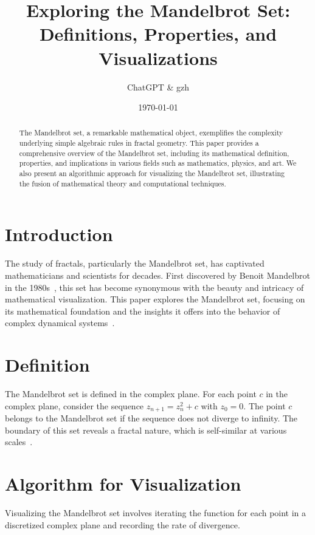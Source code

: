 \documentclass[12pt]{article}
\title{Exploring the Mandelbrot Set: Definitions, Properties, and Visualizations}
\author{ChatGPT \& gzh}
\date{\today}
\begin{document}
\maketitle

\begin{abstract}
    The Mandelbrot set, a remarkable mathematical object, exemplifies the complexity underlying simple algebraic rules in fractal geometry. This paper provides a comprehensive overview of the Mandelbrot set, including its mathematical definition, properties, and implications in various fields such as mathematics, physics, and art. We also present an algorithmic approach for visualizing the Mandelbrot set, illustrating the fusion of mathematical theory and computational techniques.
\end{abstract}

\section{Introduction}
The study of fractals, particularly the Mandelbrot set, has captivated mathematicians and scientists for decades. First discovered by Benoit Mandelbrot in the 1980s~\cite{mandelbrot1980}, this set has become synonymous with the beauty and intricacy of mathematical visualization. This paper explores the Mandelbrot set, focusing on its mathematical foundation and the insights it offers into the behavior of complex dynamical systems~\cite{devaney1990}.

\section{Definition}
The Mandelbrot set is defined in the complex plane. For each point \( c \) in the complex plane, consider the sequence \( z_{n+1} = z_n^2 + c \) with \( z_0 = 0 \). The point \( c \) belongs to the Mandelbrot set if the sequence does not diverge to infinity. The boundary of this set reveals a fractal nature, which is self-similar at various scales~\cite{barnsley1988}.

\section{Algorithm for Visualization}
Visualizing the Mandelbrot set involves iterating the function for each point in a discretized complex plane and recording the rate of divergence.
\end{document}
